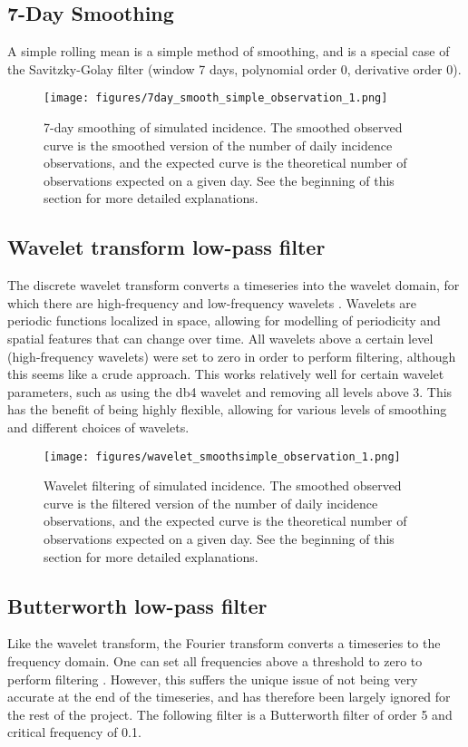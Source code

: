 \documentclass{article}
\begin{document}
{\subsection{7-Day Smoothing}
A simple rolling mean is a simple method of smoothing, and is a special case of the Savitzky-Golay filter (window 7 days, polynomial order 0, derivative order 0). 

\clearpage
\begin{figure}[h!]
    \centering
    \texttt{[image: figures/7day\_smooth\_simple\_observation\_1.png]}
    \caption{7-day smoothing of simulated incidence. The smoothed observed curve is the smoothed version of the number of daily incidence observations, and the expected curve is the theoretical number of observations expected on a given day. See the beginning of this section for more detailed explanations.} 

\end{figure}


\subsection{Wavelet transform low-pass filter}
The discrete wavelet transform converts a timeseries into the wavelet domain, for which there are high-frequency and low-frequency wavelets . Wavelets are periodic functions localized in space, allowing for modelling of periodicity and spatial features that can change over time. \cite{wavelets} All wavelets above a certain level (high-frequency wavelets) were set to zero in order to perform filtering, although this seems like a crude approach. This works relatively well for certain wavelet parameters, such as using the db4 wavelet and removing all levels above 3. This has the benefit of being highly flexible, allowing for various levels of smoothing and different choices of wavelets. 

\clearpage
\begin{figure}[h!]
    \centering
    \texttt{[image: figures/wavelet\_smoothsimple\_observation\_1.png]}
    \caption{Wavelet filtering of simulated incidence. The smoothed observed curve is the filtered version of the number of daily incidence observations, and the expected curve is the theoretical number of observations expected on a given day. See the beginning of this section for more detailed explanations.}
\end{figure}


\subsection{Butterworth low-pass filter}
Like the wavelet transform, the Fourier transform converts a timeseries to the frequency domain. One can set all frequencies above a threshold to zero to perform filtering \cite{butterworth}. However, this suffers the unique issue of not being very accurate at the end of the timeseries, and has therefore been largely ignored for the rest of the project. The following filter is a Butterworth filter of order 5 and critical frequency of 0.1.

}
\end{document}

